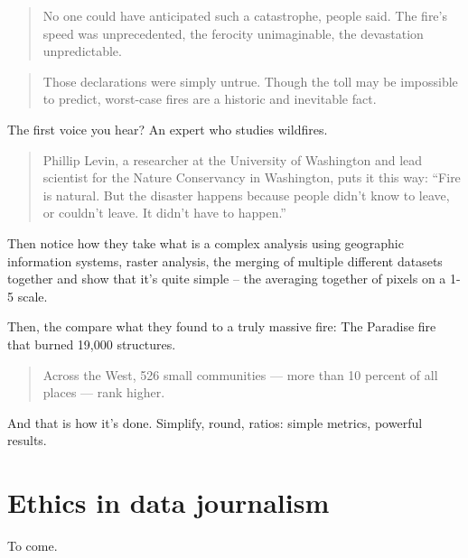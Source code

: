 \documentclass[]{book}
\begin{document}
\begin{quote}
No one could have anticipated such a catastrophe, people said. The fire's speed was unprecedented, the ferocity unimaginable, the devastation unpredictable.
\end{quote}

\begin{quote}
Those declarations were simply untrue. Though the toll may be impossible to predict, worst-case fires are a historic and inevitable fact.
\end{quote}

The first voice you hear? An expert who studies wildfires.

\begin{quote}
Phillip Levin, a researcher at the University of Washington and lead scientist for the Nature Conservancy in Washington, puts it this way: ``Fire is natural. But the disaster happens because people didn't know to leave, or couldn't leave. It didn't have to happen.''
\end{quote}

Then notice how they take what is a complex analysis using geographic information systems, raster analysis, the merging of multiple different datasets together and show that it's quite simple -- the averaging together of pixels on a 1-5 scale.

Then, the compare what they found to a truly massive fire: The Paradise fire that burned 19,000 structures.

\begin{quote}
Across the West, 526 small communities --- more than 10 percent of all places --- rank higher.
\end{quote}

And that is how it's done. Simplify, round, ratios: simple metrics, powerful results.

\hypertarget{ethics-in-data-journalism}{%
\chapter{Ethics in data journalism}\label{ethics-in-data-journalism}}

To come.
\end{document}
